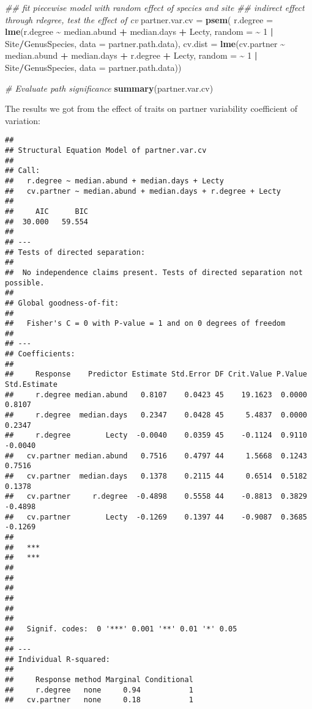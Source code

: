 \documentclass[
]{article}
\newenvironment{Shaded}{\begin{snugshade}}{\end{snugshade}}
\newcommand{\CommentTok}[1]{\textcolor[rgb]{0.56,0.35,0.01}{\textit{#1}}}
\newcommand{\DataTypeTok}[1]{\textcolor[rgb]{0.13,0.29,0.53}{#1}}
\newcommand{\DecValTok}[1]{\textcolor[rgb]{0.00,0.00,0.81}{#1}}
\newcommand{\KeywordTok}[1]{\textcolor[rgb]{0.13,0.29,0.53}{\textbf{#1}}}
\newcommand{\NormalTok}[1]{#1}
\newcommand{\OperatorTok}[1]{\textcolor[rgb]{0.81,0.36,0.00}{\textbf{#1}}}
\newcommand{\StringTok}[1]{\textcolor[rgb]{0.31,0.60,0.02}{#1}}
\begin{document}
\begin{Shaded}
\begin{Highlighting}[]
\CommentTok{\#\# fit piecewise model with random effect of species and site }
\CommentTok{\#\# indirect effect through rdegree, test the effect of cv}
\NormalTok{partner.var.cv =}\StringTok{ }\KeywordTok{psem}\NormalTok{(}
  \DataTypeTok{r.degree =} \KeywordTok{lme}\NormalTok{(r.degree }\OperatorTok{\textasciitilde{}}\StringTok{ }\NormalTok{median.abund }\OperatorTok{+}\StringTok{ }\NormalTok{median.days }\OperatorTok{+}\StringTok{ }\NormalTok{Lecty, }
                 \DataTypeTok{random =} \OperatorTok{\textasciitilde{}}\StringTok{ }\DecValTok{1} \OperatorTok{|}\StringTok{ }\NormalTok{Site}\OperatorTok{/}\NormalTok{GenusSpecies, }\DataTypeTok{data =}\NormalTok{ partner.path.data),}
  \DataTypeTok{cv.dist =} \KeywordTok{lme}\NormalTok{(cv.partner }\OperatorTok{\textasciitilde{}}\StringTok{ }\NormalTok{median.abund }\OperatorTok{+}\StringTok{ }\NormalTok{median.days }\OperatorTok{+}\StringTok{ }\NormalTok{r.degree }\OperatorTok{+}\StringTok{ }\NormalTok{Lecty, }
                \DataTypeTok{random =} \OperatorTok{\textasciitilde{}}\StringTok{ }\DecValTok{1} \OperatorTok{|}\StringTok{ }\NormalTok{Site}\OperatorTok{/}\NormalTok{GenusSpecies, }\DataTypeTok{data =}\NormalTok{ partner.path.data))}

\CommentTok{\# Evaluate path significance }
\KeywordTok{summary}\NormalTok{(partner.var.cv)}
\end{Highlighting}
\end{Shaded}

The results we got from the effect of traits on partner variability
coefficient of variation:

\begin{verbatim}
## 
## Structural Equation Model of partner.var.cv 
## 
## Call:
##   r.degree ~ median.abund + median.days + Lecty
##   cv.partner ~ median.abund + median.days + r.degree + Lecty
## 
##     AIC      BIC
##  30.000   59.554
## 
## ---
## Tests of directed separation:
## 
##  No independence claims present. Tests of directed separation not possible.
## 
## Global goodness-of-fit:
## 
##   Fisher's C = 0 with P-value = 1 and on 0 degrees of freedom
## 
## ---
## Coefficients:
## 
##     Response    Predictor Estimate Std.Error DF Crit.Value P.Value Std.Estimate
##     r.degree median.abund   0.8107    0.0423 45    19.1623  0.0000       0.8107
##     r.degree  median.days   0.2347    0.0428 45     5.4837  0.0000       0.2347
##     r.degree        Lecty  -0.0040    0.0359 45    -0.1124  0.9110      -0.0040
##   cv.partner median.abund   0.7516    0.4797 44     1.5668  0.1243       0.7516
##   cv.partner  median.days   0.1378    0.2115 44     0.6514  0.5182       0.1378
##   cv.partner     r.degree  -0.4898    0.5558 44    -0.8813  0.3829      -0.4898
##   cv.partner        Lecty  -0.1269    0.1397 44    -0.9087  0.3685      -0.1269
##      
##   ***
##   ***
##      
##      
##      
##      
##      
## 
##   Signif. codes:  0 '***' 0.001 '**' 0.01 '*' 0.05
## 
## ---
## Individual R-squared:
## 
##     Response method Marginal Conditional
##     r.degree   none     0.94           1
##   cv.partner   none     0.18           1
\end{verbatim}
\end{document}
